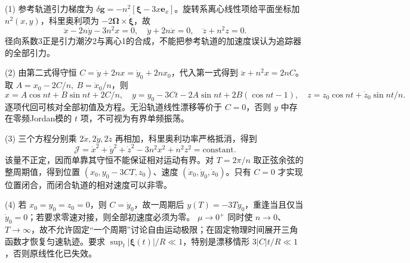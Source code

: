 (1) 参考轨道引力梯度为 \(\delta\boldsymbol g=-n^2[\boldsymbol\xi-3x\boldsymbol e_x]\)。旋转系离心线性项给平面坐标加 \(n^2(x,y)\)，科里奥利项为 \(-2\boldsymbol\Omega\times\dot{\boldsymbol\xi}\)，故
\[
\boxed{\ddot x-2n\dot y-3n^2x=0,\quad\ddot y+2n\dot x=0,\quad\ddot z+n^2z=0}.
\]
径向系数3正是引力潮汐2与离心1的合成，不能把参考轨道的加速度误认为追踪器的全部引力。

(2) 由第二式得守恒 \(C=\dot y+2nx=\dot y_0+2nx_0\)，代入第一式得到 \(\ddot x+n^2x=2nC\)。取 \(A=x_0-2C/n,\ B=\dot x_0/n\)，则
\[
x=A\cos nt+B\sin nt+2C/n,\quad
y=y_0-3Ct-2A\sin nt+2B(\cos nt-1),\quad
z=z_0\cos nt+\dot z_0\sin nt/n.
\]
逐项代回可核对全部初值及方程。无沿轨道线性漂移等价于 \(C=0\)，否则 \(y\) 中存在零频Jordan模的 \(t\) 项，不可视为有界单频振荡。

(3) 三个方程分别乘 \(2\dot x,2\dot y,2\dot z\) 再相加，科里奥利功率严格抵消，得到
\[
\mathcal J=\dot x^2+\dot y^2+\dot z^2-3n^2x^2+n^2z^2=\mathrm{constant}.
\]
该量不正定，因而单靠其守恒不能保证相对运动有界。对 \(T=2\pi/n\) 取正弦余弦的整周期值，得到位置 \((x_0,y_0-3CT,z_0)\)、速度 \((\dot x_0,\dot y_0,\dot z_0)\)。只有 \(C=0\) 才实现位置闭合，而闭合轨道的相对速度可以非零。

(4) 若 \(x_0=y_0=z_0=0\)，则 \(C=\dot y_0\)，故一周期后 \(y(T)=-3T\dot y_0\)，重逢当且仅当 \(\dot y_0=0\)；若要求零速对接，则全部初速度必须为零。 \(\mu\to0^+\) 同时使 \(n\to0\)、\(T\to\infty\)，故不允许固定“一个周期”讨论自由运动极限；在固定物理时间展开三角函数才恢复匀速轨迹。要求 \(\sup_t|\boldsymbol\xi(t)|/R\ll1\)，特别是漂移情形 \(3|C|t/R\ll1\)，否则原线性化已失效。
